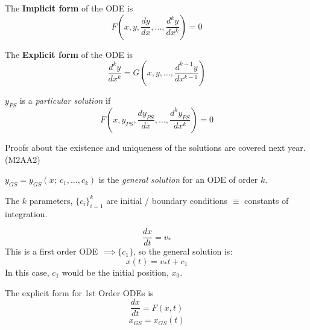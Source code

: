 \documentclass[10pt]{scrartcl}
\begin{document}

\begin{definition}
The \textbf{Implicit form} of the ODE is
\[F\left(x,y,\frac{dy}{dx},\dots,\frac{d^ky}{dx^k}\right)= 0\]
\end{definition}

\begin{definition}
The \textbf{Explicit form} of the ODE is
\[\frac{d^ky}{dx^k} = G\left(x,y,\dots,\frac{d^{k-1}y}{dx^{k-1}}\right)\]
\end{definition}

\begin{definition}
$y_{PS}$ is a \emph{particular solution} if 
\[F\left(x,y_{PS},\frac{dy_{PS}}{dx},\dots,\frac{d^ky_{PS}}{dx^k}\right)= 0\]
\end{definition}

\begin{note}
Proofs about the existence and uniqueness of the solutions are covered next year. (M2AA2)
\end{note}

\begin{definition}
$y_{GS} = y_{GS}(x;\ c_1,\dots,c_k)$ is the \emph{general solution} for an ODE of order $k$.

 The $k$ parameters, $\{c_i\}_{i=1}^k$ are initial / boundary conditions $\equiv$ constants of integration.
\end{definition}\vspace*{5pt}

\begin{example}[Velocity]
\[\frac{dx}{dt} = v_*\]
This is a first order ODE $\implies \{c_1\}$, so the general solution is:
\[x(t) = v_*t + c_1\]
In this case, $c_1$ would be the initial position, $x_0$.
\end{example}



The explicit form for 1st Order ODEs is
\[\frac{dx}{dt} = F(x,t)\]
\[x_{GS} = x_{GS}(t)\]
\end{document}
